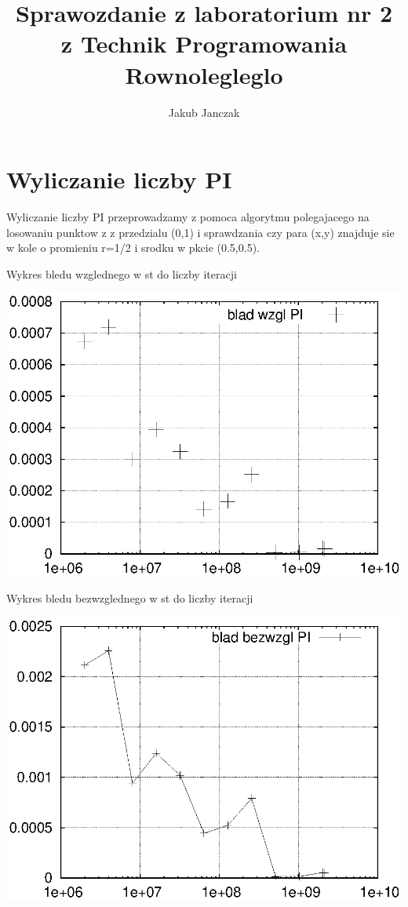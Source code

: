 \documentclass{article}
\title{Sprawozdanie z laboratorium nr 2 z Technik Programowania Rownolegleglo}
\author{Jakub Janczak}
\begin{document}
\maketitle
\section{Wyliczanie liczby PI}

Wyliczanie liczby PI przeprowadzamy z pomoca algorytmu polegajacego na losowaniu punktow z z przedzialu (0,1) i sprawdzania czy para (x,y) znajduje sie w kole o promieniu r=1/2 i srodku w pkcie (0.5,0.5).

Wykres bledu wzglednego w st do liczby iteracji

\includegraphics{wzgl.eps}

Wykres bledu bezwzglednego w st do liczby iteracji

\includegraphics{bezwzgl.eps}
\end{document}
